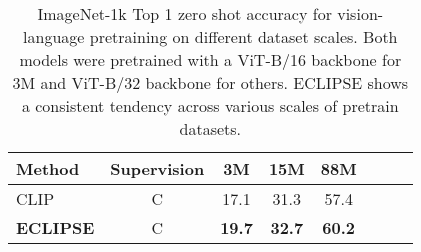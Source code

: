 \begin{table}[t]
  \centering
  \small
  \begin{tabular}{l c c c c c c c}
    \toprule
    Method & Supervision & 3M   & 15M    & 88M \\ \midrule
    CLIP                 & C   & 17.1 & 31.3   & 57.4 \\ %
    \textbf{ECLIPSE}     & C &\textbf{19.7} & \textbf{32.7} & \textbf{60.2} \\
    \bottomrule
  \end{tabular}
  \vspace{0.5em}
  \caption{
  ImageNet-1k Top 1 zero shot accuracy for vision-language pretraining on different dataset scales. Both models were pretrained with a ViT-B/16 backbone for 3M and ViT-B/32 backbone for others.
  ECLIPSE shows a consistent tendency across various scales of pretrain datasets.
  }
  \label{tab:scale}
\end{table}